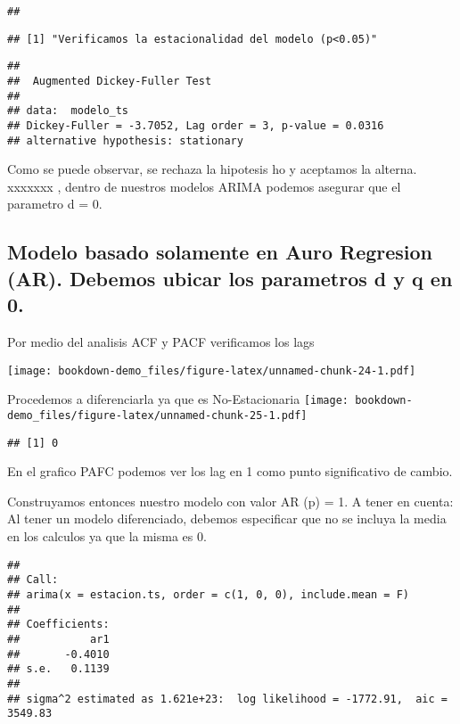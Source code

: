 \documentclass[
]{book}
\begin{document}
\begin{verbatim}
## 
\end{verbatim}

\begin{verbatim}
## [1] "Verificamos la estacionalidad del modelo (p<0.05)"
\end{verbatim}

\begin{verbatim}
## 
##  Augmented Dickey-Fuller Test
## 
## data:  modelo_ts
## Dickey-Fuller = -3.7052, Lag order = 3, p-value = 0.0316
## alternative hypothesis: stationary
\end{verbatim}

Como se puede observar, se rechaza la hipotesis ho y aceptamos la alterna. xxxxxxx , dentro de nuestros modelos ARIMA podemos asegurar que el parametro d = 0.

\hypertarget{modelo-basado-solamente-en-auro-regresion-ar.-debemos-ubicar-los-parametros-d-y-q-en-0.}{%
\subsection{Modelo basado solamente en Auro Regresion (AR). Debemos ubicar los parametros d y q en 0.}\label{modelo-basado-solamente-en-auro-regresion-ar.-debemos-ubicar-los-parametros-d-y-q-en-0.}}

Por medio del analisis ACF y PACF verificamos los lags

\texttt{[image: bookdown-demo\_files/figure-latex/unnamed-chunk-24-1.pdf]}

Procedemos a diferenciarla ya que es No-Estacionaria
\texttt{[image: bookdown-demo\_files/figure-latex/unnamed-chunk-25-1.pdf]}

\begin{verbatim}
## [1] 0
\end{verbatim}

En el grafico PAFC podemos ver los lag en 1 como punto significativo de cambio.

Construyamos entonces nuestro modelo con valor AR (p) = 1. A tener en cuenta: Al tener un modelo diferenciado, debemos especificar que no se incluya la media en los calculos ya que la misma es 0.

\begin{verbatim}
## 
## Call:
## arima(x = estacion.ts, order = c(1, 0, 0), include.mean = F)
## 
## Coefficients:
##           ar1
##       -0.4010
## s.e.   0.1139
## 
## sigma^2 estimated as 1.621e+23:  log likelihood = -1772.91,  aic = 3549.83
\end{verbatim}
\end{document}
